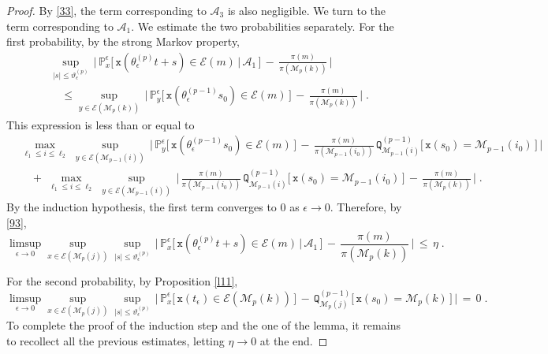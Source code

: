 \documentclass[reqno]{amsart}
\theoremstyle{plain}
\theoremstyle{definition}
\newcommand{\bb}[1]{{\mathbb #1}}
\newcommand{\ms}[1]{{\mathscr #1}}
\newcommand{\mtt}[1]{{\mathtt #1}}
\newcounter{as}[section]
\newcommand{\<}{\langle}
\renewcommand{\>}{\rangle}
\begin{document}
\begin{proof}
By \eqref{33}, the term corresponding to $\mathscr{A}_{3}$ is also
negligible.  We turn to the term corresponding to
$\mathscr{A}_{1}$. We estimate the two probabilities separately. For
the first probability, by the strong Markov property,
\begin{align*}
& \sup_{|s|\le\vartheta^{(p)}_\epsilon}\, \Big|\,
\bb P_x^{\epsilon } \big[\, \mtt x
(\theta_{\epsilon}^{(p)}t+s) \in \ms E(m)
\,\big|\,\mathscr{A}_1 \,\big]
\,-\, \frac{\pi(m)}{\pi(\ms M_{p}(k))}
\, \Big|
\\
&\quad \le
\sup_{y\in \ms E(\ms M_p(k))}\, \Big|\,
\bb P_y^{\epsilon } \big[\, \mtt x
(\theta_{\epsilon}^{(p-1)}s_0) \in \ms E(m) \,\big]
\,-\, \frac{\pi(m)}{\pi(\ms M_{p}(k))}
\, \Big|\;.
\end{align*}
This expression is less than or equal to
\begin{align*}
& \max_{\ell_1\le i\le \ell_2}\, \sup_{y\in \ms E(\ms M_{p-1}(i))}
\,\Big|\, \bb P_y^{\epsilon } \big[\, \mtt x
(\theta_{\epsilon}^{(p-1)}s_0) \in \ms E(m) \,\big]
\,-\, \frac{\pi(m)}{\pi(\ms M_{p-1}(i_0))} 
\, \mtt Q^{(p-1)}_{\ms M_{p-1}(i)} \big[\,
\mtt x (s_{0}) = \ms M_{p-1}(i_0) \,\big] \,\Big|
\\
& \quad +\, \max_{\ell_1\le i\le \ell_2}\, \sup_{y\in \ms E(\ms M_{p-1}(i))}
\,\Big|\, \frac{\pi(m)}{\pi(\ms M_{p-1}(i_0))} 
\, \mtt Q^{(p-1)}_{\ms M_{p-1}(i)} \big[\,
\mtt x (s_{0}) = \ms M_{p-1}(i_0) \,\big]
\,-\,  \frac{\pi(m)}{\pi(\ms M_{p}(k))} \,\Big|\;.
\end{align*}
By the induction hypothesis, the first term converges to $0$ as
$\epsilon\to0$.  Therefore, by \eqref{93},
\begin{equation*}
\limsup_{\epsilon\to0}  \sup_{x \in\mathcal{E}(\ms M_p(j))}
\sup_{|s|\le\vartheta^{(p)}_\epsilon}\, \Big|\,
\bb P_x^{\epsilon } \big[\, \mtt x
(\theta_{\epsilon}^{(p)}t+s) \in \ms E(m)
\,\big|\,\mathscr{A}_1 \,\big]
\,-\, \frac{\pi(m)}{\pi(\ms M_{p}(k))}
\, \Big| \,\le\, \eta\;.
\end{equation*}

For the second probability, by Proposition \ref{l11},
\begin{equation*}
\limsup_{\epsilon\to0}  \sup_{x \in\mathcal{E}(\ms M_p(j))}
\sup_{|s|\le\vartheta^{(p)}_\epsilon}\, \Big|\,
\bb P_x^{\epsilon } \big[\, \mtt x (t_{\epsilon}) \in \ms E(\ms
M_{p}(k))  \,\big]
\,-\, \mtt Q^{(p-1)}_{\ms M_{p}(j)} \big[\,
\mtt x (s_{0}) = \ms M_{p}(k) \,\big]
\, \Big| \,=\, 0\;.
\end{equation*}
To complete the proof of the induction step and the one of the lemma,
it remains to recollect all the previous estimates, letting $\eta\to 0$
at the end.
\end{proof}
\end{document}
